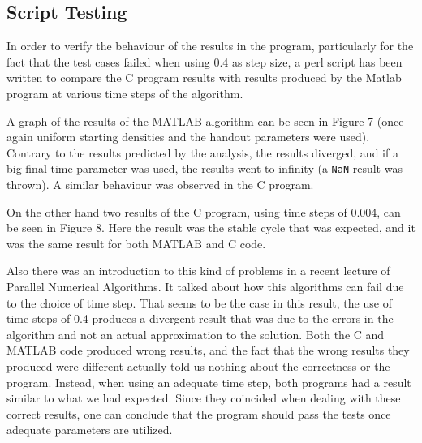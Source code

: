 \documentclass[12pt,a4paper]{article}
\begin{document}


\subsection{Script Testing}


In order to verify the behaviour of the results in the program, particularly for the fact that the test cases failed when using 0.4 as step size, a perl script has been written to compare the C program results with results produced by the Matlab program at various time steps of the algorithm. 

A graph of the results of the MATLAB algorithm can be seen in Figure 7 (once again uniform starting densities and the handout parameters were used). Contrary to the results predicted by the analysis, the results diverged, and if a big final time parameter was used, the results went to infinity (a \texttt{NaN} result was thrown). A similar behaviour was observed in the C program.

On the other hand two results of the C program, using time steps of 0.004, can be seen in Figure 8. Here the result was the stable cycle that was expected, and it was the same result for both MATLAB and C code.

Also there was an introduction to this kind of problems in a recent lecture of Parallel Numerical Algorithms. It talked about how this algorithms can fail due to the choice of time step. That seems to be the case in this result, the use of time steps of 0.4 produces a divergent result that was due to the errors in the algorithm and not an actual approximation to the solution. Both the C and MATLAB code produced wrong results, and the fact that the wrong results they produced were different actually told us nothing about the correctness or the program. Instead, when using an adequate time step, both programs had a result similar to what we had expected. Since they coincided when dealing with these correct results, one can conclude that the program should pass the tests once adequate parameters are utilized.
\end{document}

